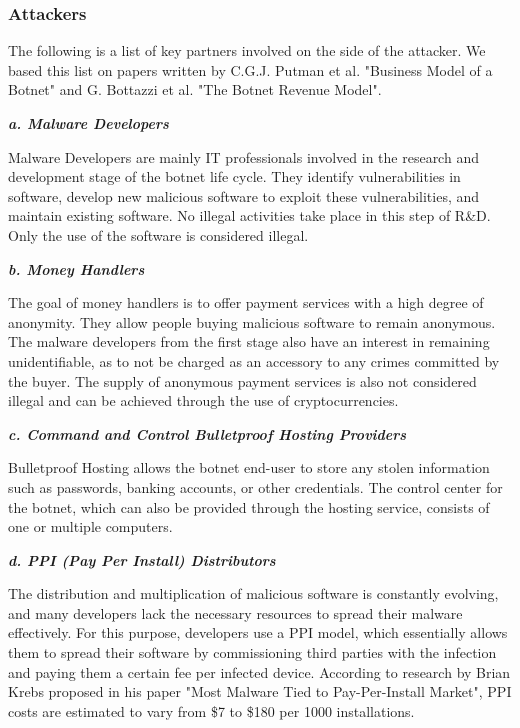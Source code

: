 		\subsubsection{Attackers}

			The following is a list of key partners involved on the side of the attacker. We based this list on papers written by C.G.J. Putman et al. "Business Model of a Botnet" and G. Bottazzi et al. "The Botnet Revenue Model".

			\textbf{\textit{a. Malware Developers}}
			
			Malware Developers are mainly IT professionals involved in the research and development stage of the botnet life cycle. They identify vulnerabilities in software, develop new malicious software to exploit these vulnerabilities, and maintain existing software. No illegal activities take place in this step of R\&D. Only the use of the software is considered illegal.

			\textbf{\textit{b. Money Handlers}}
			
			The goal of money handlers is to offer payment services with a high degree of anonymity. They allow people buying malicious software to remain anonymous. The malware developers from the first stage also have an interest in remaining unidentifiable, as to not be charged as an accessory to any crimes committed by the buyer. The supply of anonymous payment services is also not considered illegal and can be achieved through the use of cryptocurrencies.

			\textbf{\textit{c. Command and Control Bulletproof Hosting Providers}}
			
			Bulletproof Hosting allows the botnet end-user to store any stolen information such as passwords, banking accounts, or other credentials. The control center for the botnet, which can also be provided through the hosting service, consists of one or multiple computers.

			\textbf{\textit{d. PPI (Pay Per Install) Distributors}}
			
			The distribution and multiplication of malicious software is constantly evolving, and many developers lack the necessary resources to spread their malware effectively. For this purpose, developers use a PPI model, which essentially allows them to spread their software by commissioning third parties with the infection and paying them a certain fee per infected device. According to research by Brian Krebs proposed in his paper "Most Malware Tied to Pay-Per-Install Market", PPI costs are estimated to vary from \$7 to \$180 per 1000 installations.

